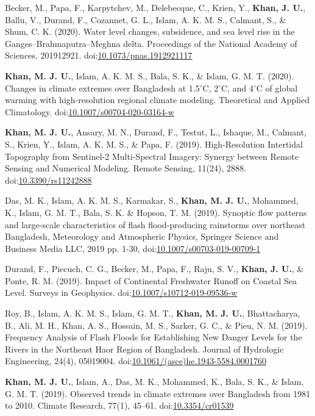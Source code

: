 \documentclass[11pt,a4paper,sans]{moderncv}
\begin{document}
\begin{hangparas}{1cm}{1}
Becker, M., Papa, F., Karpytchev, M., Delebecque, C., Krien, Y., \textbf{Khan, J. U.}, Ballu, V., Durand, F., Cozannet, G. L., Islam, A. K. M. S., Calmant, S., \& Shum, C. K. (2020). Water level changes, subsidence, and sea level rise in the Ganges--Brahmaputra--Meghna delta. Proceedings of the National Academy of Sciences, 201912921. doi:\href{https://doi.org/10.1073/pnas.1912921117}{10.1073/pnas.1912921117} 

\textbf{Khan, M. J. U.}, Islam, A. K. M. S., Bala, S. K., \& Islam, G. M. T. (2020). Changes in climate extremes over Bangladesh at 1.5$^{\circ}$C, 2$^{\circ}$C, and 4$^{\circ}$C of global warming with high-resolution regional climate modeling. Theoretical and Applied Climatology. doi:\href{https://doi.org/10.1007/s00704-020-03164-w}{10.1007/s00704-020-03164-w}

\textbf{Khan, M. J. U.}, Ansary, M. N., Durand, F., Testut, L., Ishaque, M., Calmant, S., Krien, Y., Islam, A. K. M. S., \& Papa, F. (2019). High-Resolution Intertidal Topography from Sentinel-2 Multi-Spectral Imagery: Synergy between Remote Sensing and Numerical Modeling. Remote Sensing, 11(24), 2888. doi:\href{https://doi.org/10.3390/rs11242888}{10.3390/rs11242888} 

Das, M. K., Islam, A. K. M. S., Karmakar, S., \textbf{Khan, M. J. U.}, Mohammed, K., Islam, G. M. T., Bala, S. K. \& Hopson, T. M. (2019). Synoptic flow patterns and large-scale characteristics of flash flood-producing rainstorms over northeast Bangladesh, Meteorology and Atmospheric Physics, Springer Science and Business Media LLC, 2019 pp. 1-30, doi:\href{https://dx.doi.org/10.1007/s00703-019-00709-1}{10.1007/s00703-019-00709-1}

Durand, F., Piecuch, C. G., Becker, M., Papa, F., Raju, S. V., \textbf{Khan, J. U.}, \& Ponte, R. M. (2019). Impact of Continental Freshwater Runoff on Coastal Sea Level. Surveys in Geophysics. doi:\href{https://doi.org/10.1007/s10712-019-09536-w}{10.1007/s10712-019-09536-w} 

Roy, B., Islam, A. K. M. S., Islam, G. M. T., \textbf{Khan, M. J. U.}, Bhattacharya, B., Ali, M. H., Khan, A. S., Hossain, M. S., Sarker, G. C., \& Pieu, N. M. (2019). Frequency Analysis of Flash Floods for Establishing New Danger Levels for the Rivers in the Northeast Haor Region of Bangladesh. Journal of Hydrologic Engineering, 24(4), 05019004. doi:\href{https://doi.org/10.1061/(asce)he.1943-5584.0001760}{10.1061/(asce)he.1943-5584.0001760}

\textbf{Khan, M. J. U.}, Islam, A., Das, M. K., Mohammed, K., Bala, S. K., \& Islam, G. M. T. (2019). Observed trends in climate extremes over Bangladesh from 1981 to 2010. Climate Research, 77(1), 45--61. doi:\href{https://doi.org/10.3354/cr01539}{10.3354/cr01539}


\end{hangparas}
\end{document}
